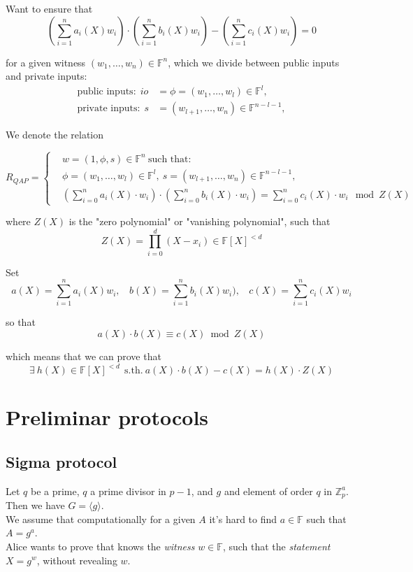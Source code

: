 \documentclass{article}
\begin{document}
Want to ensure that
$$
(\sum_{i=1}^n a_i(X) w_i) \cdot (\sum_{i=1}^n b_i(X) w_i) - (\sum_{i=1}^n c_i(X) w_i) = 0
$$

for a given witness $(w_1, \ldots, w_n) \in \mathbb{F}^n$, which we divide between public inputs and private inputs:
\begin{align*}
    \text{public inputs:}~~ io &= \phi = (w_1, \ldots, w_l) \in \mathbb{F}^l, \\
    \text{private inputs:}~~ s &= (w_{l+1}, \ldots, w_n) \in \mathbb{F}^{n-l-1},
\end{align*}

We denote the relation

$$
R_{QAP} =
\left\{
\begin{aligned}
    &w=(1, \phi, s) \in \mathbb{F}^n ~\text{such that:}\\
    &\phi = (w_1, \ldots, w_l) \in \mathbb{F}^l,~
    s = (w_{l+1}, \ldots, w_n) \in \mathbb{F}^{n-l-1},\\
& (\sum_{i=0}^n a_i(X) \cdot w_i) \cdot (\sum_{i=0}^n b_i(X) \cdot w_i)
= \sum_{i=0}^{n} c_i(X) \cdot w_i 
~\bmod Z(X)
\end{aligned}
\right.
$$

where $Z(X)$ is the "zero polynomial" or "vanishing polynomial", such that
$$Z(X)= \prod_{i=0}^d (X-x_i) \in \mathbb{F}[X]^{<d}$$

Set
$$a(X) = \sum_{i=1}^n a_i(X) w_i,~~~~ b(X) = \sum_{i=1}^n b_i(X) w_i),~~~~ c(X) = \sum_{i=1}^{n} c_i(X) w_i$$

so that
$$a(X) \cdot b(X) \equiv c(X) \bmod Z(X)$$

which means that we can prove that
$$\exists~ h(X) \in \mathbb{F}[X]^{<d}~~ \text{s.th.}~
a(X) \cdot b(X) - c(X) = h(X) \cdot Z(X)$$


\vspace{1.0cm}
\section{Preliminar protocols}
\subsection{Sigma protocol}

Let $q$ be a prime, $q$ a prime divisor in $p-1$, and $g$ and element of order $q$ in $\mathbb{Z}_p^a$. Then we have $G = \langle g \rangle$.
\\
We assume that computationally for a given $A$ it's hard to find $a \in \mathbb{F}$ such that $A = g^a$.
\\
Alice wants to prove that knows the \emph{witness} $w \in \mathbb{F}$, such that the \emph{statement} $X = g^w$, without revealing $w$.
\end{document}
